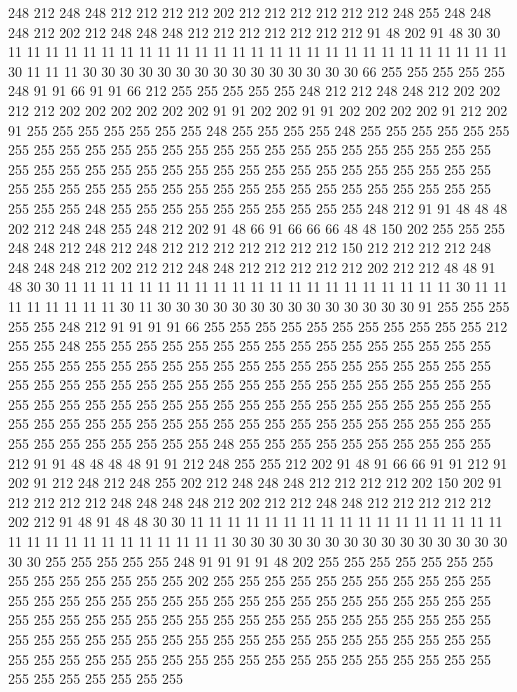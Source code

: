 248 212 248 248 212 212 212 212 202 212 212 212 212 212 212 248 255 248 248 248
212 202 212 248 248 248 212 212 212 212 212 212 212 91 48 202 91 48 30 30
11 11 11 11 11 11 11 11 11 11 11 11 11 11 11 11 11 11 11 11
11 11 11 11 11 11 11 30 11 11 11 30 30 30 30 30 30 30 30 30
30 30 30 30 30 30 66 255 255 255 255 255 248 91 91 66 91 91 66 212
255 255 255 255 255 248 212 212 248 248 212 202 202 212 212 202 202 202 202 202
202 91 91 202 202 91 91 202 202 202 202 91 212 202 91 255 255 255 255 255
255 255 248 255 255 255 255 248 255 255 255 255 255 255 255 255 255 255 255 255
255 255 255 255 255 255 255 255 255 255 255 255 255 255 255 255 255 255 255 255
255 255 255 255 255 255 255 255 255 255 255 255 255 255 255 255 255 255 255 255
255 255 255 255 255 255 255 255 255 255 255 255 255 255 248 255 255 255 255 255
255 255 255 255 255 248 212 91 91 48 48 48 202 212 248 248 255 248 212 202
91 48 66 91 66 66 66 48 48 150 202 255 255 255 248 248 212 248 212 248
212 212 212 212 212 212 212 150 212 212 212 212 248 248 248 248 212 202 212 212
248 248 212 212 212 212 212 202 212 212 48 48 91 48 30 30 11 11 11 11
11 11 11 11 11 11 11 11 11 11 11 11 11 11 11 11 11 30 11 11
11 11 11 11 11 11 30 11 30 30 30 30 30 30 30 30 30 30 30 30
30 30 91 255 255 255 255 255 248 212 91 91 91 91 66 255 255 255 255 255
255 255 255 255 255 255 212 255 255 248 255 255 255 255 255 255 255 255 255 255
255 255 255 255 255 255 255 255 255 255 255 255 255 255 255 255 255 255 255 255
255 255 255 255 255 255 255 255 255 255 255 255 255 255 255 255 255 255 255 255
255 255 255 255 255 255 255 255 255 255 255 255 255 255 255 255 255 255 255 255
255 255 255 255 255 255 255 255 255 255 255 255 255 255 255 255 255 255 255 255
255 255 255 255 255 255 255 255 255 255 248 255 255 255 255 255 255 255 255 255
255 212 91 91 48 48 48 48 91 91 212 248 255 255 212 202 91 48 91 66
66 91 91 212 91 202 91 212 248 212 248 255 202 212 248 248 248 212 212 212
212 202 150 202 91 212 212 212 212 248 248 248 248 212 202 212 212 248 248 212
212 212 212 212 202 212 91 48 91 48 48 30 30 11 11 11 11 11 11 11
11 11 11 11 11 11 11 11 11 11 11 11 11 11 11 11 11 11 11 11
11 11 30 30 30 30 30 30 30 30 30 30 30 30 30 30 30 30 30 255
255 255 255 255 248 91 91 91 91 48 202 255 255 255 255 255 255 255 255 255
255 255 255 255 255 202 255 255 255 255 255 255 255 255 255 255 255 255 255 255
255 255 255 255 255 255 255 255 255 255 255 255 255 255 255 255 255 255 255 255
255 255 255 255 255 255 255 255 255 255 255 255 255 255 255 255 255 255 255 255
255 255 255 255 255 255 255 255 255 255 255 255 255 255 255 255 255 255 255 255
255 255 255 255 255 255 255 255 255 255 255 255 255 255 255 255 255 255 255 255
